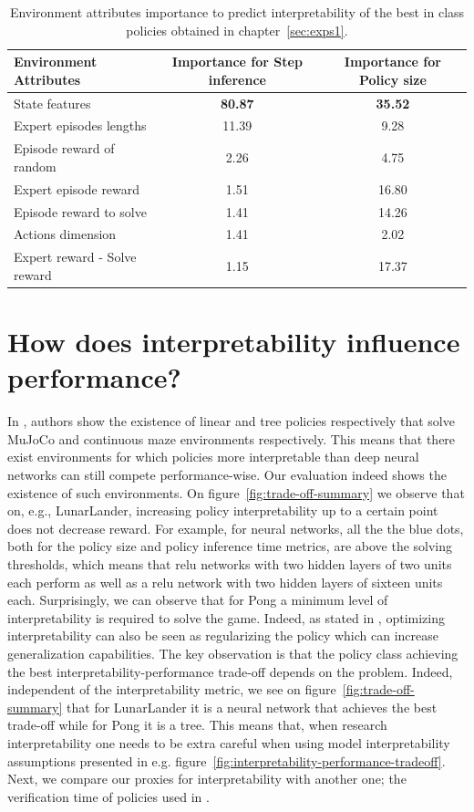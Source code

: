 \begin{table}
\centering
\small
\begin{tabular}{lcc}
\toprule
Environment Attributes & Importance for Step inference & Importance for Policy size \\
\midrule
State features & \textbf{80.87} & \textbf{35.52} \\
Expert episodes lengths & 11.39 & 9.28 \\
Episode reward of random & 2.26 & 4.75 \\
Expert episode reward & 1.51 & 16.80 \\
Episode reward to solve & 1.41 & 14.26 \\
Actions dimension & 1.41 & 2.02 \\
Expert reward - Solve reward & 1.15 & 17.37 \\
\bottomrule
\end{tabular}
\caption{Environment attributes importance to predict interpretability of the best in class policies obtained in chapter~\ref{sec:exps1}.}
\label{tab:combined_importance}
\end{table}

\section{How does interpretability influence performance?}
In \cite{empirical-evidence,theory1}, authors show the existence of linear and tree policies respectively that solve MuJoCo and continuous maze environments respectively.
This means that there exist environments for which policies more interpretable than deep neural networks can still compete performance-wise.
Our evaluation indeed shows the existence of such environments.
On figure~\ref{fig:trade-off-summary} we observe that on, e.g., LunarLander, increasing policy interpretability up to a certain point does not decrease reward.
For example, for neural networks, all the the blue dots, both for the policy size and policy inference time metrics, are above the solving thresholds, which means that relu networks with two hidden layers of two units each perform as well as a relu network with two hidden layers of sixteen units each. 
Surprisingly, we can observe that for Pong a minimum level of interpretability is required to solve the game.
Indeed, as stated in \cite{study-0}, optimizing interpretability can also be seen as regularizing the policy which can increase generalization capabilities. 
The key observation is that the policy class achieving the best interpretability-performance trade-off depends on the problem.
Indeed, independent of the interpretability metric, we see on figure~\ref{fig:trade-off-summary} that for LunarLander it is a neural network that achieves the best trade-off while for Pong it is a tree.
This means that, when research interpretability one needs to be extra careful when using model interpretability assumptions presented in e.g. figure~\ref{fig:interpretability-performance-tradeoff}.
Next, we compare our proxies for interpretability with another one; the verification time of policies used in \cite{viper,lens-complexity}.


